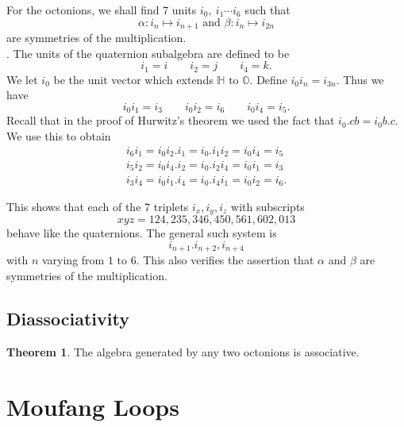 \documentclass[11pt]{report}
\theoremstyle{plain}
\theoremstyle{definition}
\newtheorem{theorem}{Theorem}
\begin{document}
For the octonions, we shall find 7 units $ i_0, \  i_1 \cdots i_6$ such that 
$$\alpha : i_n \mapsto i_{n+1} \text{ and } \beta : i_n \mapsto i_{2n} $$ are symmetries of the multiplication.
$$   $$. The units of the quaternion subalgebra are defined to be 
$$ i_1 = i \qquad i_2 = j \qquad i_4 = k. $$ We let $ i_0 $ be the unit vector which extends $\mathbb{H}  \text{ to } \mathbb{O}. $ Define $ i_0i_n = i_{3n} $. 
Thus we have 
$$ i_0i_1 = i_3 \qquad i_0i_2 = i_6 \qquad i_0i_4=i_5.  $$
Recall that in the proof of Hurwitz's theorem we used the fact that $ i_0.cb = i_0b.c $. We use this to obtain 
\begin{align*}
i_6i_1 = i_0i_2.i_1 = i_0.i_1i_2 = i_0i_4 = i_5\\
i_5i_2 = i_0i_4.i_2 = i_0.i_2i_4 = i_0i_1 = i_3\\
i_3i_4 = i_0i_1.i_4 = i_0.i_4i_1 = i_0i_2 = i_6.
\end{align*}

This shows that each of the 7 triplets $ i_x, i_y, i_z  $ with subscripts 
$$xyz = 124, 235, 346, 450, 561,602, 013 $$ behave like the quaternions. The general such system is $$ i_{n+1}. i_{n+2}, i_{n+4}$$ with $ n $ varying from $ 1 \text{ to } 6. $ This also verifies the assertion that $ \alpha $ and $ \beta $ are symmetries of the multiplication.
\section{Diassociativity}
\begin{theorem}
	The algebra generated by any two octonions is associative.
\end{theorem}	
\chapter{Moufang Loops}	
\end{document}
